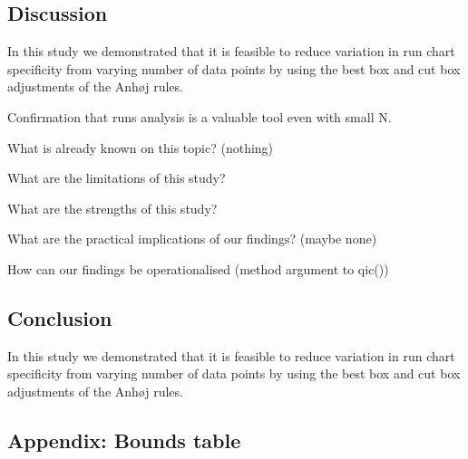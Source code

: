 \hypertarget{discussion}{%
\subsection{Discussion}\label{discussion}}

In this study we demonstrated that it is feasible to reduce variation in
run chart specificity from varying number of data points by using the
best box and cut box adjustments of the Anhøj rules.

Confirmation that runs analysis is a valuable tool even with small N.

What is already known on this topic? (nothing)

What are the limitations of this study?

What are the strengths of this study?

What are the practical implications of our findings? (maybe none)

How can our findings be operationalised (method argument to qic())

\hypertarget{conclusion}{%
\subsection{Conclusion}\label{conclusion}}

In this study we demonstrated that it is feasible to reduce variation in
run chart specificity from varying number of data points by using the
best box and cut box adjustments of the Anhøj rules.



\hypertarget{appendix-bounds-table}{%
\subsection{Appendix: Bounds table}\label{appendix-bounds-table}}

